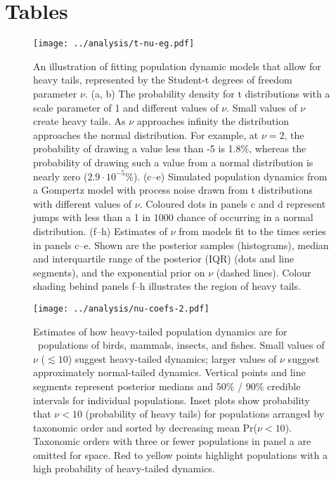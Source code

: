 


\clearpage

\section{Tables}



\begin{figure}[htbp]
\begin{center}
\texttt{[image: ../analysis/t-nu-eg.pdf]}
\caption{
An illustration of fitting population dynamic models that allow for heavy
tails, represented by the Student-t degrees of freedom parameter $\nu$. (a, b)
The probability density for t distributions with a scale parameter of 1 and
different values of $\nu$. Small values of $\nu$ create heavy tails. As $\nu$
approaches infinity the distribution approaches the normal distribution. For
example, at $\nu = 2$, the probability of drawing a value less than -5 is
1.8\%, whereas the probability of drawing such a value from a normal
distribution is nearly zero ($2.9\cdot10^{-5}$\%). (c--e) Simulated population
dynamics from a Gompertz model with process noise drawn from t distributions
with different values of $\nu$. Coloured dots in panels c and d represent jumps
with less than a 1 in 1000 chance of occurring in a normal distribution. (f--h)
Estimates of $\nu$ from models fit to the times series in panels c--e. Shown
are the posterior samples (histograms), median and interquartile range of the
posterior (IQR) (dots and line segments), and the exponential prior on $\nu$
(dashed lines). Colour shading behind panels f--h illustrates the region of
heavy tails.}
\label{fig:didactic}
\end{center}
\end{figure}

\clearpage

\begin{figure}[htbp]
\begin{center}
\texttt{[image: ../analysis/nu-coefs-2.pdf]}
\caption{
Estimates of how heavy-tailed population dynamics are for \nuCoefPopN\
populations of birds, mammals, insects, and fishes. Small values of $\nu$
($\lesssim 10$) suggest heavy-tailed dynamics; larger values of $\nu$ suggest
approximately normal-tailed dynamics. Vertical points and line segments
represent posterior medians and 50\% / 90\% credible intervals for individual
populations. Inset plots show probability that $\nu < 10$ (probability of
heavy tails) for populations arranged by taxonomic order and sorted by
decreasing mean Pr($\nu < 10$). Taxonomic orders with three or fewer
populations in panel a are omitted for space. Red to yellow points highlight
populations with a high probability of heavy-tailed dynamics.
} \label{fig:nu-coefs} \end{center} \end{figure}

